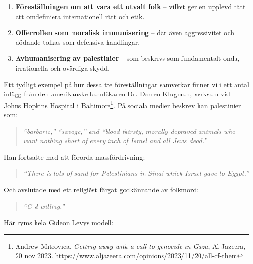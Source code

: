 \begin{enumerate}
    \item \textbf{Föreställningen om att vara ett utvalt folk} – vilket ger en upplevd rätt att omdefiniera internationell rätt och etik.
    \item \textbf{Offerrollen som moralisk immunisering} – där även aggressivitet och dödande tolkas som defensiva handlingar.
    \item \textbf{Avhumanisering av palestinier} – som beskrivs som fundamentalt onda, irrationella och ovärdiga skydd.
\end{enumerate}

Ett tydligt exempel på hur dessa tre föreställningar samverkar finner vi i ett antal inlägg från den amerikanske barnläkaren Dr. Darren Klugman, verksam vid Johns Hopkins Hospital i Baltimore\footnote{Andrew Mitrovica, \textit{Getting away with a call to genocide in Gaza}, Al Jazeera, 20 nov 2023. \url{https://www.aljazeera.com/opinions/2023/11/20/all-of-them}}. På sociala medier beskrev han palestinier som:

\begin{quote}
\textit{“barbaric,” “savage,” and “blood thirsty, morally depraved animals who want nothing short of every inch of Israel and all Jews dead.”}
\end{quote}

Han fortsatte med att förorda massfördrivning:
\begin{quote}
\textit{“There is lots of sand for Palestinians in Sinai which Israel gave to Egypt.”}
\end{quote}

Och avslutade med ett religiöst färgat godkännande av folkmord:
\begin{quote}
\textit{“G-d willing.”}
\end{quote}

Här ryms hela Gideon Levys modell:

